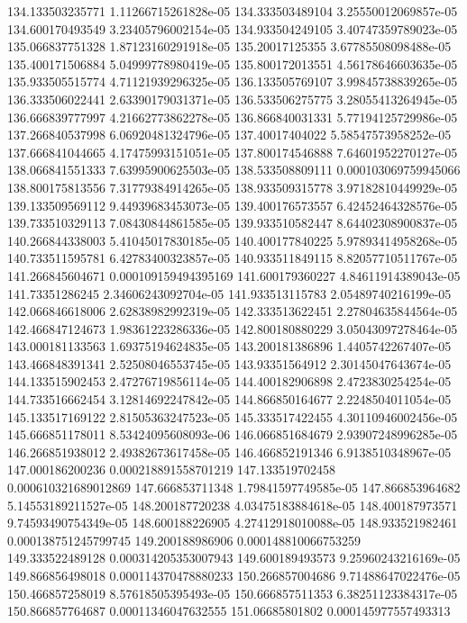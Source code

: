 {134.133503235771 1.11266715261828e-05
134.333503489104 3.25550012069857e-05
134.600170493549 3.23405796002154e-05
134.933504249105 3.40747359789023e-05
135.066837751328 1.87123160291918e-05
135.20017125355 3.67785508098488e-05
135.400171506884 5.04999778980419e-05
135.800172013551 4.56178646603635e-05
135.933505515774 4.71121939296325e-05
136.133505769107 3.99845738839265e-05
136.333506022441 2.63390179031371e-05
136.533506275775 3.28055413264945e-05
136.666839777997 4.21662773862278e-05
136.866840031331 5.77194125729986e-05
137.266840537998 6.06920481324796e-05
137.40017404022 5.58547573958252e-05
137.666841044665 4.17475993151051e-05
137.800174546888 7.64601952270127e-05
138.066841551333 7.63995900625503e-05
138.533508809111 0.000103069759945066
138.800175813556 7.31779384914265e-05
138.933509315778 3.97182810449929e-05
139.133509569112 9.44939683453073e-05
139.400176573557 6.42452464328576e-05
139.733510329113 7.08430844861585e-05
139.933510582447 8.64402308900837e-05
140.266844338003 5.41045017830185e-05
140.400177840225 5.97893414958268e-05
140.733511595781 6.42783400323857e-05
140.933511849115 8.82057710511767e-05
141.266845604671 0.000109159494395169
141.600179360227 4.84611914389043e-05
141.73351286245 2.34606243092704e-05
141.933513115783 2.05489740216199e-05
142.066846618006 2.62838982992319e-05
142.333513622451 2.27804635844564e-05
142.466847124673 1.98361223286336e-05
142.800180880229 3.05043097278464e-05
143.000181133563 1.69375194624835e-05
143.200181386896 1.4405742267407e-05
143.466848391341 2.52508046553745e-05
143.93351564912 2.30145047643674e-05
144.133515902453 2.47276719856114e-05
144.400182906898 2.4723830254254e-05
144.733516662454 3.12814692247842e-05
144.866850164677 2.2248504011054e-05
145.133517169122 2.81505363247523e-05
145.333517422455 4.30110946002456e-05
145.666851178011 8.53424095608093e-06
146.066851684679 2.93907248996285e-05
146.266851938012 2.49382673617458e-05
146.466852191346 6.9138510348967e-05
147.000186200236 0.000218891558701219
147.133519702458 0.000610321689012869
147.666853711348 1.79841597749585e-05
147.866853964682 5.14553189211527e-05
148.200187720238 4.03475183884618e-05
148.400187973571 9.74593490754349e-05
148.600188226905 4.27412918010088e-05
148.933521982461 0.000138751245799745
149.200188986906 0.000148810066753259
149.333522489128 0.000314205353007943
149.600189493573 9.25960243216169e-05
149.866856498018 0.000114370478880233
150.266857004686 9.71488647022476e-05
150.466857258019 8.57618505395493e-05
150.666857511353 6.38251123384317e-05
150.866857764687 0.00011346047632555
151.06685801802 0.000145977557493313
}
